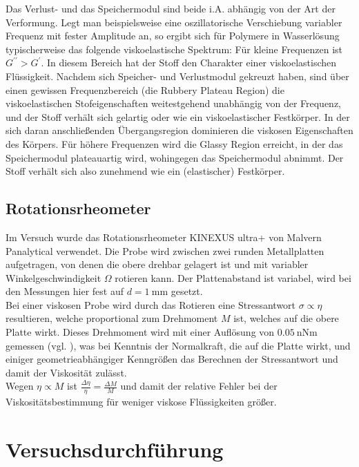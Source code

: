 \documentclass[11pt,a4paper,oneside]{scrartcl}
\begin{document}
Das Verlust- und das Speichermodul sind beide i.A. abhängig von der Art der Verformung. Legt man beispielsweise eine oszillatorische Verschiebung variabler Frequenz mit fester Amplitude an, so ergibt sich für Polymere in Wasserlösung typischerweise das folgende viskoelastische Spektrum:
Für kleine Frequenzen ist $G^{\prime\prime}>G^{\prime}$. In diesem Bereich hat der Stoff den Charakter einer viskoelastischen Flüssigkeit. Nachdem sich Speicher- und Verlustmodul gekreuzt haben, sind über einen gewissen Frequenzbereich (die Rubbery Plateau Region) die viskoelastischen Stofeigenschaften weitestgehend unabhängig von der Frequenz, und der Stoff verhält sich gelartig oder wie ein viskoelastischer Festkörper. In der sich daran anschließenden Übergangsregion dominieren die viskosen Eigenschaften des Körpers. Für höhere Frequenzen wird die Glassy Region erreicht, in der das Speichermodul plateauartig wird, wohingegen das Speichermodul abnimmt. Der Stoff verhält sich also zunehmend wie ein (elastischer) Festkörper.
\subsection{Rotationsrheometer}\label{rheometer}
Im Versuch wurde das Rotationsrheometer KINEXUS ultra+ von Malvern Panalytical verwendet. Die Probe wird zwischen zwei runden Metallplatten aufgetragen, von denen die obere drehbar gelagert ist und mit variabler Winkelgeschwindigkeit $\Omega$ rotieren kann. Der Plattenabstand ist variabel, wird bei den Messungen hier fest auf $d=1\ \mathrm{mm}$ gesetzt. \\
Bei einer viskosen Probe wird durch das Rotieren eine Stressantwort $\sigma\propto\eta$ resultieren, welche proportional zum Drehmoment $M$ ist, welches auf die obere Platte wirkt. Dieses Drehmoment wird mit einer Auflösung von $0.05\ \mathrm{nNm}$ gemessen (vgl. \cite{malvern_2017}), was bei Kenntnis der Normalkraft, die auf die Platte wirkt, und einiger geometrieabhängiger Kenngrößen das Berechnen der Stressantwort und damit der Viskosität zulässt.\\
Wegen $\eta\propto M$ ist $\frac{\Delta\eta}{\eta}=\frac{\Delta M}{M}$ und damit der relative Fehler bei der Viskositätsbestimmung für weniger viskose Flüssigkeiten größer.
\section{Versuchsdurchführung}
\end{document}

